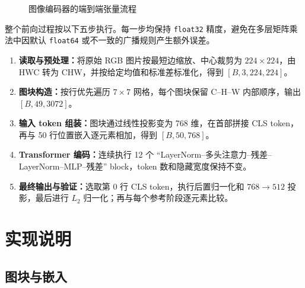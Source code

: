 \documentclass[a4paper,12pt]{article}
\begin{document}
\begin{figure}[H]
\centering
{}
\caption{图像编码器的端到端张量流程}
\label{fig:overall-flow}
\end{figure}

整个前向过程按以下五步执行。每一步均保持 \texttt{float32} 精度，避免在多层矩阵乘法中因默认 \texttt{float64} 或不一致的广播规则产生额外误差。

\begin{enumerate}
    \item \textbf{读取与预处理：}将原始 RGB 图片按最短边缩放、中心裁剪为 $224\times224$，由 HWC 转为 CHW，并按给定均值和标准差标准化，得到 $[B,3,224,224]$。
    \item \textbf{图块构造：}按行优先遍历 $7\times7$ 网格，每个图块保留 C--H--W 内部顺序，输出 $[B,49,3072]$。
    \item \textbf{输入 token 组装：}图块通过线性投影变为 768 维，在首部拼接 CLS token，再与 50 行位置嵌入逐元素相加，得到 $[B,50,768]$。
    \item \textbf{Transformer 编码：}连续执行 12 个 ``LayerNorm--多头注意力--残差--LayerNorm--MLP--残差'' block，token 数和隐藏宽度保持不变。
    \item \textbf{最终输出与验证：}选取第 0 行 CLS token，执行后置归一化和 $768\rightarrow512$ 投影，最后进行 $L_2$ 归一化；再与每个参考阶段逐元素比较。
\end{enumerate}

\section{实现说明}



\subsection{图块与嵌入}
\end{document}
